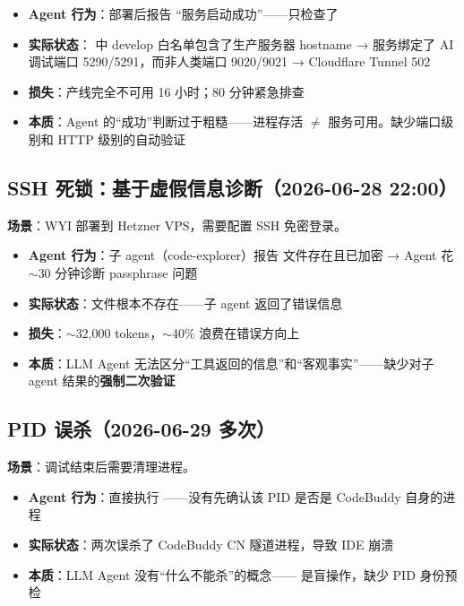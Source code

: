 \documentclass[10pt, openany]{book}
\begin{document}
\begin{itemize}
    \item \textbf{Agent 行为}：部署后报告 ``服务启动成功''——只检查了 
    \item \textbf{实际状态}： 中 develop 白名单包含了生产服务器 hostname → 服务绑定了 AI 调试端口 5290/5291，而非人类端口 9020/9021 → Cloudflare Tunnel 502
    \item \textbf{损失}：产线完全不可用 16 小时；80 分钟紧急排查
    \item \textbf{本质}：Agent 的``成功''判断过于粗糙——进程存活 \(\neq\) 服务可用。缺少端口级别和 HTTP 级别的自动验证
\end{itemize}

\subsection{SSH 死锁：基于虚假信息诊断（2026-06-28 22:00）}

\textbf{场景}：WYI 部署到 Hetzner VPS，需要配置 SSH 免密登录。

\begin{itemize}
    \item \textbf{Agent 行为}：子 agent（code-explorer）报告  文件存在且已加密 → Agent 花 \(\sim\)30 分钟诊断 passphrase 问题
    \item \textbf{实际状态}：文件根本不存在——子 agent 返回了错误信息~\cite{Kadavath2022SelfEvaluation}
    \item \textbf{损失}：\(\sim\)32,000 tokens，\(\sim\)40\% 浪费在错误方向上
    \item \textbf{本质}：LLM Agent 无法区分``工具返回的信息''和``客观事实''——缺少对子 agent 结果的\textbf{强制二次验证}
\end{itemize}

\subsection{PID 误杀（2026-06-29 多次）}

\textbf{场景}：调试结束后需要清理进程。

\begin{itemize}
    \item \textbf{Agent 行为}：直接执行 ——没有先确认该 PID 是否是 CodeBuddy 自身的进程
    \item \textbf{实际状态}：两次误杀了 CodeBuddy CN 隧道进程，导致 IDE 崩溃
    \item \textbf{本质}：LLM Agent 没有``什么不能杀''的概念—— 是盲操作，缺少 PID 身份预检
\end{itemize}
\end{document}
